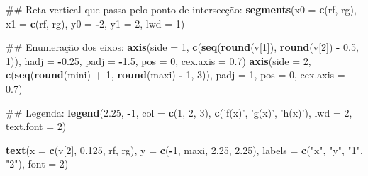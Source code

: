 \documentclass[]{book}
\newenvironment{Shaded}{\begin{snugshade}}{\end{snugshade}}
\newcommand{\KeywordTok}[1]{\textcolor[rgb]{0.13,0.29,0.53}{\textbf{#1}}}
\newcommand{\DataTypeTok}[1]{\textcolor[rgb]{0.13,0.29,0.53}{#1}}
\newcommand{\DecValTok}[1]{\textcolor[rgb]{0.00,0.00,0.81}{#1}}
\newcommand{\FloatTok}[1]{\textcolor[rgb]{0.00,0.00,0.81}{#1}}
\newcommand{\StringTok}[1]{\textcolor[rgb]{0.31,0.60,0.02}{#1}}
\newcommand{\OperatorTok}[1]{\textcolor[rgb]{0.81,0.36,0.00}{\textbf{#1}}}
\newcommand{\NormalTok}[1]{#1}
\begin{document}
\begin{enumerate}
\begin{Shaded}
\begin{Highlighting}[]
\NormalTok{##  Reta vertical que passa pelo ponto de intersecção:}
\KeywordTok{segments}\NormalTok{(}\DataTypeTok{x0 =} \KeywordTok{c}\NormalTok{(rf, rg), }\DataTypeTok{x1 =} \KeywordTok{c}\NormalTok{(rf, rg),}
     \DataTypeTok{y0 =} \OperatorTok{-}\DecValTok{2}\NormalTok{, }\DataTypeTok{y1 =} \DecValTok{2}\NormalTok{, }\DataTypeTok{lwd =} \DecValTok{1}\NormalTok{)}

\NormalTok{##  Enumeração dos eixos:}
\KeywordTok{axis}\NormalTok{(}\DataTypeTok{side =} \DecValTok{1}\NormalTok{, }\KeywordTok{c}\NormalTok{(}\KeywordTok{seq}\NormalTok{(}\KeywordTok{round}\NormalTok{(v[}\DecValTok{1}\NormalTok{]), }\KeywordTok{round}\NormalTok{(v[}\DecValTok{2}\NormalTok{]) }\OperatorTok{-}\StringTok{ }\FloatTok{0.5}\NormalTok{, }\DecValTok{1}\NormalTok{)),}
 \DataTypeTok{hadj =} \OperatorTok{-}\FloatTok{0.25}\NormalTok{, }\DataTypeTok{padj =} \OperatorTok{-}\FloatTok{1.5}\NormalTok{, }\DataTypeTok{pos =} \DecValTok{0}\NormalTok{, }\DataTypeTok{cex.axis =} \FloatTok{0.7}\NormalTok{)}
\KeywordTok{axis}\NormalTok{(}\DataTypeTok{side =} \DecValTok{2}\NormalTok{, }\KeywordTok{c}\NormalTok{(}\KeywordTok{seq}\NormalTok{(}\KeywordTok{round}\NormalTok{(mini) }\OperatorTok{+}\StringTok{ }\DecValTok{1}\NormalTok{, }\KeywordTok{round}\NormalTok{(maxi) }\OperatorTok{-}\StringTok{ }\DecValTok{1}\NormalTok{, }\DecValTok{3}\NormalTok{)),}
 \DataTypeTok{padj =} \DecValTok{1}\NormalTok{, }\DataTypeTok{pos =} \DecValTok{0}\NormalTok{, }\DataTypeTok{cex.axis =} \FloatTok{0.7}\NormalTok{)}

\NormalTok{##  Legenda:}
\KeywordTok{legend}\NormalTok{(}\FloatTok{2.25}\NormalTok{, }\OperatorTok{-}\DecValTok{1}\NormalTok{, }\DataTypeTok{col =} \KeywordTok{c}\NormalTok{(}\DecValTok{1}\NormalTok{, }\DecValTok{2}\NormalTok{, }\DecValTok{3}\NormalTok{), }\KeywordTok{c}\NormalTok{(}\StringTok{'f(x)'}\NormalTok{, }\StringTok{'g(x)'}\NormalTok{, }\StringTok{'h(x)'}\NormalTok{),}
   \DataTypeTok{lwd =} \DecValTok{2}\NormalTok{, }\DataTypeTok{text.font =} \DecValTok{2}\NormalTok{)}

\KeywordTok{text}\NormalTok{(}\DataTypeTok{x =} \KeywordTok{c}\NormalTok{(v[}\DecValTok{2}\NormalTok{], }\FloatTok{0.125}\NormalTok{, rf, rg), }\DataTypeTok{y =} \KeywordTok{c}\NormalTok{(}\OperatorTok{-}\DecValTok{1}\NormalTok{, maxi, }\FloatTok{2.25}\NormalTok{, }\FloatTok{2.25}\NormalTok{),}
 \DataTypeTok{labels =} \KeywordTok{c}\NormalTok{(}\StringTok{"x"}\NormalTok{, }\StringTok{"y"}\NormalTok{, }\StringTok{"1"}\NormalTok{, }\StringTok{"2"}\NormalTok{), }\DataTypeTok{font =} \DecValTok{2}\NormalTok{)}
\end{Highlighting}
\end{Shaded}


\end{enumerate}
\end{document}
